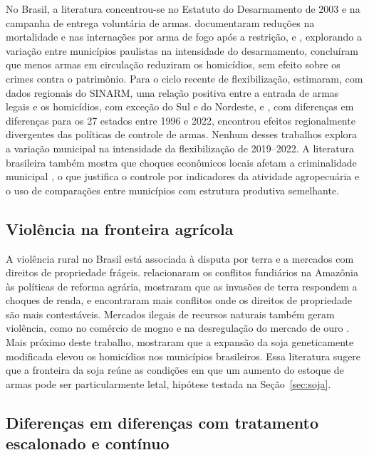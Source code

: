 \documentclass[11pt,a4paper]{article}
\begin{document}
No Brasil, a literatura concentrou-se no Estatuto do Desarmamento de 2003 e na campanha de entrega voluntária de armas. \citet{souza2007} documentaram reduções na mortalidade e nas internações por arma de fogo após a restrição, e \citet{cerqueira2012}, explorando a variação entre municípios paulistas na intensidade do desarmamento, concluíram que menos armas em circulação reduziram os homicídios, sem efeito sobre os crimes contra o patrimônio. Para o ciclo recente de flexibilização, \citet{baculi2021} estimaram, com dados regionais do SINARM, uma relação positiva entre a entrada de armas legais e os homicídios, com exceção do Sul e do Nordeste, e \citet{wakim2025}, com diferenças em diferenças para os 27 estados entre 1996 e 2022, encontrou efeitos regionalmente divergentes das políticas de controle de armas. Nenhum desses trabalhos explora a variação municipal na intensidade da flexibilização de 2019--2022. A literatura brasileira também mostra que choques econômicos locais afetam a criminalidade municipal \citep{dixcarneiro2018}, o que justifica o controle por indicadores da atividade agropecuária e o uso de comparações entre municípios com estrutura produtiva semelhante.

\subsection{Violência na fronteira agrícola}

A violência rural no Brasil está associada à disputa por terra e a mercados com direitos de propriedade frágeis. \citet{alston2000} relacionaram os conflitos fundiários na Amazônia às políticas de reforma agrária, \citet{hidalgo2010} mostraram que as invasões de terra respondem a choques de renda, e \citet{fetzer2017} encontraram mais conflitos onde os direitos de propriedade são mais contestáveis. Mercados ilegais de recursos naturais também geram violência, como no comércio de mogno \citep{chimeli2017} e na desregulação do mercado de ouro \citep{pereira2026}. Mais próximo deste trabalho, \citet{moreno2024} mostraram que a expansão da soja geneticamente modificada elevou os homicídios nos municípios brasileiros. Essa literatura sugere que a fronteira da soja reúne as condições em que um aumento do estoque de armas pode ser particularmente letal, hipótese testada na Seção~\ref{sec:soja}.

\subsection{Diferenças em diferenças com tratamento escalonado e contínuo}
\end{document}
